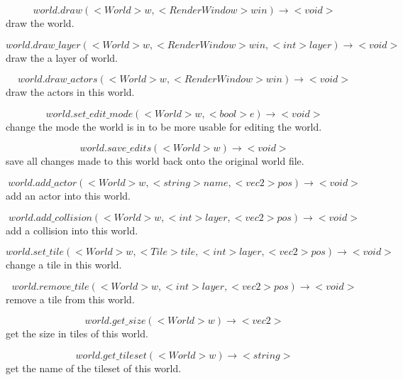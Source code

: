 \documentclass[11pt,fleqn]{book} %
\begin{document}
\begin{equation}
world.draw(<World> w, <RenderWindow> win) \rightarrow <void>
\end{equation}
draw the world.

\begin{equation}
world.draw\_layer(<World> w, <RenderWindow> win, <int> layer) \rightarrow <void>
\end{equation}
draw the a layer of world.

\begin{equation}
world.draw\_actors(<World> w, <RenderWindow> win) \rightarrow <void>
\end{equation}
draw the actors in this world.

\begin{equation}
world.set\_edit\_mode(<World> w, <bool> e) \rightarrow <void>
\end{equation}
change the mode the world is in to be more usable for editing the world.

\begin{equation}
world.save\_edits(<World> w) \rightarrow <void>
\end{equation}
save all changes made to this world back onto the original world file.

\begin{equation}
world.add\_actor(<World> w, <string> name, <vec2> pos) \rightarrow <void>
\end{equation}
add an actor into this world.

\begin{equation}
world.add\_collision(<World> w, <int> layer, <vec2> pos) \rightarrow <void>
\end{equation}
add a collision into this world.

\begin{equation}
world.set\_tile(<World> w, <Tile> tile, <int> layer, <vec2> pos) \rightarrow <void>
\end{equation}
change a tile in this world.

\begin{equation}
world.remove\_tile(<World> w, <int> layer, <vec2> pos) \rightarrow <void>
\end{equation}
remove a tile from this world.

\begin{equation}
world.get\_size(<World> w) \rightarrow <vec2>
\end{equation}
get the size in tiles of this world.


\begin{equation}
world.get\_tileset(<World> w) \rightarrow <string>
\end{equation}
get the name of the tileset of this world.
\end{document}
